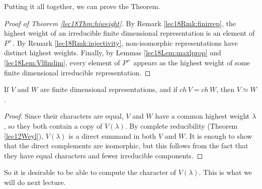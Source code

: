  Putting it all together, we can prove the Theorem.
 \begin{proof}[Proof of Theorem \ref{lec18Thm:hiweight}]
   By Remark \ref{lec18Rmk:finirrep}, the highest weight of an irreducible finite
   dimensional representation is an element of $P^+$. By Remark
   \ref{lec18Rmk:injectivity}, non-isomorphic representations have distinct highest
   weights. Finally, by Lemmas \ref{lec18Lem:maxlprop} and \ref{lec18Lem:Vlfindim},
   every element of $P^+$ appears as the highest weight of some finite dimensional
   irreducible representation.
 \end{proof}
 \begin{corollary}
   If $V$ and $W$ are finite dimensional representations, and if $ch\, V = ch\, W$,
   then $V\simeq W$.
 \end{corollary}
 \begin{proof}
   Since their characters are equal, $V$ and $W$ have a common highest weight
   $\lambda$, so they both contain a copy of $V(\lambda)$. By complete reducibility
   (Theorem \ref{lec12Weyl}), $V(\lambda)$ is a direct summand in both $V$ and $W$. It
   is enough to show that the direct complements are isomorphic, but this follows from
   the fact that they have equal characters and fewer irreducible components.
 \end{proof}

 So it is desirable to be able to compute the character of $V(\lambda)$. This is what
 we will do next lecture.
